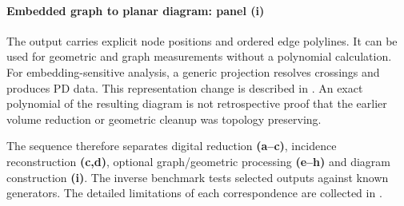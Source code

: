 \paragraph{Embedded graph to planar diagram: panel (i)}
The output carries explicit node positions and ordered edge polylines. It can be used for geometric and graph measurements without a polynomial calculation. For embedding-sensitive analysis, a generic projection resolves crossings and produces PD data. This representation change is described in . An exact polynomial of the resulting diagram is not retrospective proof that the earlier volume reduction or geometric cleanup was topology preserving.

The sequence therefore separates digital reduction \textbf{(a--c)}, incidence reconstruction \textbf{(c,d)}, optional graph/geometric processing \textbf{(e--h)} and diagram construction \textbf{(i)}. The inverse benchmark tests selected outputs against known generators. The detailed limitations of each correspondence are collected in .

